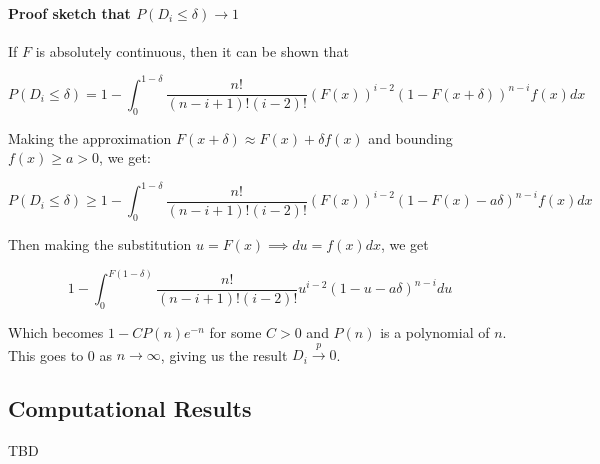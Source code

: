\documentclass[
  11pt,
]{article}
\begin{document}
\hypertarget{proof-sketch-that-pd_i-leq-delta-to-1}{%
\paragraph{\texorpdfstring{Proof sketch that
\(P(D_i \leq \delta) \to 1\)}{Proof sketch that P(D\_i \textbackslash leq \textbackslash delta) \textbackslash to 1}}\label{proof-sketch-that-pd_i-leq-delta-to-1}}

If \(F\) is absolutely continuous, then it can be shown that

\[P(D_i \leq \delta) = 1 - \int_0^{1-\delta} \frac{n!}{(n-i+1)! (i-2)!} (F(x))^{i-2} (1 - F(x + \delta))^{n-i} f(x) dx\]

Making the approximation \(F(x+\delta) \approx F(x) + \delta f(x)\) and
bounding \(f(x) \geq a > 0\), we get:

\[P(D_i \leq \delta) \geq 1 - \int_0^{1-\delta} \frac{n!}{(n-i+1)! (i-2)!} (F(x))^{i-2} (1 - F(x) - a \delta)^{n-i} f(x) dx\]

Then making the substitution \(u = F(x) \implies du = f(x) dx\), we get

\[1 - \int_0^{F(1-\delta)} \frac{n!}{(n-i+1)! (i-2)!} u^{i-2} (1 - u - a \delta)^{n-i} du\]

Which becomes \(1 - C P(n) e^{-n}\) for some \(C > 0\) and \(P(n)\) is a
polynomial of \(n\). This goes to 0 as \(n \to \infty\), giving us the
result \(D_i \stackrel{p}{\to} 0\).

\hypertarget{computational-results}{%
\subsection{Computational Results}\label{computational-results}}

TBD

  
\end{document}
